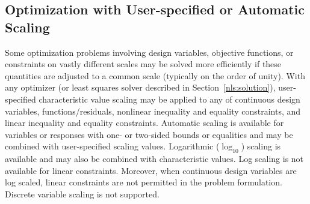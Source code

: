 

\subsection{Optimization with User-specified or Automatic Scaling}\label{opt:additional:scaling}

Some optimization problems involving design variables, objective
functions, or constraints on vastly different scales may be solved
more efficiently if these quantities are adjusted to a common scale
(typically on the order of unity).  With any optimizer (or least
squares solver described in Section~\ref{nls:solution}),
user-specified characteristic value scaling may be applied to any of
continuous design variables, functions/residuals, nonlinear inequality
and equality constraints, and linear inequality and equality
constraints.  Automatic scaling is available for variables or
responses with one- or two-sided bounds or equalities and may be
combined with user-specified scaling values.  Logarithmic
($\log_{10}$) scaling is available and may also be combined with
characteristic values.  Log scaling is not available for linear
constraints.  Moreover, when continuous design variables are log
scaled, linear constraints are not permitted in the problem
formulation.  Discrete variable scaling is not supported.

